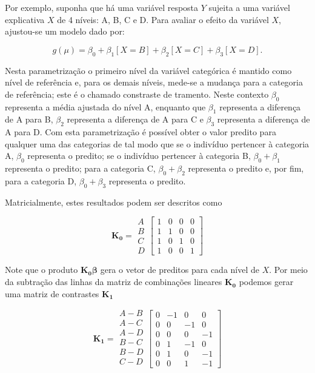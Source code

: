 Por exemplo, suponha que há uma variável resposta $Y$ sujeita a uma variável explicativa $X$ de 4 níveis: A, B, C e D. Para avaliar o efeito da variável $X$, ajustou-se um modelo dado por:

$$g(\mu) = \beta_0 + \beta_1[X=B] + \beta_2[X=C] + \beta_3[X=D].$$

\noindent Nesta parametrização o primeiro nível da variável categórica é mantido como nível de referência e, para os demais níveis, mede-se a mudança para a categoria de referência; este é o chamado constraste de tramento. Neste contexto $\beta_0$ representa a média ajustada do nível A, enquanto que $\beta_1$ representa a diferença de A para B, $\beta_2$ representa a diferença de A para C e $\beta_3$ representa a diferença de A para D. Com esta parametrização é possível obter o valor predito para qualquer uma das categorias de tal modo que se o indivíduo pertencer à categoria A, $\beta_0$ representa o predito; se o indivíduo pertencer à categoria B, $\beta_0 + \beta_1$ representa o predito; para a categoria C, $\beta_0 + \beta_2$ representa o predito e, por fim, para a categoria D, $\beta_0 + \beta_3$ representa o predito.

Matricialmente, estes resultados podem ser descritos como

$$
    \boldsymbol{K_0} = 
      \begin{matrix}
        A\\ 
        B\\ 
        C\\ 
        D 
      \end{matrix} 
    \begin{bmatrix}
      1 & 0 & 0 & 0\\ 
      1 & 1 & 0 & 0\\ 
      1 & 0 & 1 & 0\\ 
      1 & 0 & 0 & 1 
    \end{bmatrix}
$$

Note que o produto $\boldsymbol{K_0} \boldsymbol{\beta}$ gera o vetor de preditos para cada nível de $X$. Por meio da subtração das linhas da matriz de combinações lineares $\boldsymbol{K_0}$ podemos gerar uma matriz de contrastes $\boldsymbol{K_1}$

$$
    \boldsymbol{K_1} = 
      \begin{matrix}
        A-B\\ 
        A-C\\ 
        A-D\\ 
        B-C\\
        B-D\\
        C-D\\ 
      \end{matrix} 
    \begin{bmatrix}
      0 & -1 &  0 &  0\\ 
      0 &  0 & -1 &  0\\ 
      0 &  0 &  0 & -1\\ 
      0 &  1 & -1 &  0\\ 
      0 &  1 &  0 & -1\\ 
      0 &  0 &  1 & -1 
    \end{bmatrix}
$$

